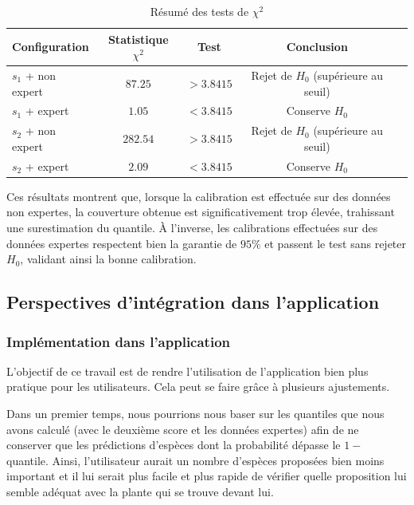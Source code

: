 \documentclass[a4paper,12pt]{article}
\begin{document}
\begin{table}[H]
    \centering
    \begin{tabular}{|l|c|c|c|c|}
        \hline
        \textbf{Configuration} & \textbf{Statistique $\chi^2$} & \textbf{Test} & \textbf{Conclusion} \\
        \hline
        $s_1$ + non expert & $87.25$ & $> 3.8415$ & Rejet de $H_0$ (supérieure au seuil) \\
        $s_1$ + expert & $1.05$ & $< 3.8415$  & Conserve $H_0$ \\
        $s_2$ + non expert & $282.54$ & $> 3.8415$ & Rejet de $H_0$ (supérieure au seuil) \\
        $s_2$ + expert & $2.09$ & $< 3.8415$ & Conserve $H_0$ \\
        \hline
    \end{tabular}
    \caption{Résumé des tests de $\chi^2$}
    \label{tab:Tests du Chi-2}
\end{table}

Ces résultats montrent que, lorsque la calibration est effectuée sur des données non expertes, la couverture obtenue est significativement trop élevée, trahissant une surestimation du quantile. À l’inverse, les calibrations effectuées sur des données expertes respectent bien la garantie de $95\%$ et passent le test sans rejeter $H_0$, validant ainsi la bonne calibration.

\subsection{Perspectives d'intégration dans l'application}

\subsubsection{Implémentation dans l'application}

L'objectif de ce travail est de rendre l'utilisation de l'application bien plus pratique pour les utilisateurs. Cela peut se faire grâce à plusieurs ajustements.

\vspace{0.2cm}

Dans un premier temps, nous pourrions nous baser sur les quantiles que nous avons calculé (avec le deuxième score et les données expertes) afin de ne conserver que les prédictions d'espèces dont la probabilité dépasse le $1 -$ quantile. Ainsi, l'utilisateur aurait un nombre d'espèces proposées bien moins important et il lui serait plus facile et plus rapide de vérifier quelle proposition lui semble adéquat avec la plante qui se trouve devant lui.
\end{document}
